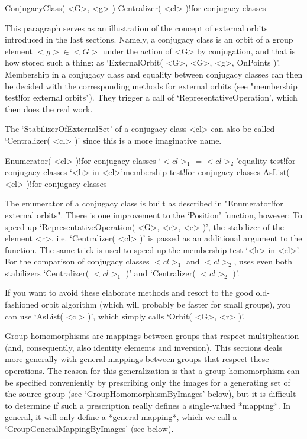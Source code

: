 \null

\>ConjugacyClass( <G>, <g> )
\>Centralizer( <cl> )!{for conjugacy classes}

This paragraph  serves  as an illustration  of  the  concept  of external
orbits introduced in  the last sections. Namely,  a conjugacy class is an
orbit  of a   group  element $<g>\in  <G>$  under  the action  of <G>  by
conjugation,  and   that  is  how    {\GAP}  stored such    a  thing:  as
`ExternalOrbit(  <G>,  <G>, <g>, OnPoints  )'.  Membership in a conjugacy
class and equality between conjugacy classes can then be decided with the
corresponding   methods for  external  orbits   (see "membership test!for
external orbits").  They trigger   a call  of  `RepresentativeOperation',
which then does the real work.

The  `StabilizerOfExternalSet' of  a   conjugacy class <cl>  can also  be
called `Centralizer( <cl> )' since this is a more imaginative name.

\>Enumerator( <cl> )!{for conjugacy classes}
\>`$<cl>_1$ = $<cl>_2$'{equality test}!{for conjugacy classes}
\>`<h> in <cl>'{membership test}!{for conjugacy classes}
\>AsList( <cl> )!{for conjugacy classes}

The  enumerator  of  a    conjugacy class  is  built  as     described in
"Enumerator!for  external orbits".  There   is  one  improvement  to  the
`Position' function,  however: To speed up `RepresentativeOperation( <G>,
<r>, <e>  )', the stabilizer of  the element <r>, i.e. `Centralizer( <cl>
)' is passed as an additional argument to the function. The same trick is
used to speed up the membership test `<h> in <cl>'. For the comparison of
conjugacy  classes  $<cl>_1$ and   $<cl>_2$,    {\GAP}  uses even    both
stabilizers `Centralizer( $<cl>_1$ )' and `Centralizer( $<cl>_2$ )'.

If   you want to avoid these   elaborate methods and  resort  to the good
old-fashioned orbit  algorithm (which will  probably  be faster for small
groups), you can  use `AsList( <cl>  )', which simply calls `Orbit(  <G>,
<r> )'.


Group homomorphisms    are   mappings  between  groups     that   respect
multiplication (and, consequently, also identity elements and inversion).
This sections  deals more generally  with general mappings between groups
that respect these operations. The reason for this generalization is that
a  group homomorphism can be specified  conveniently  by prescribing only
the     images for  a   generating   set    of  the  source   group  (see
`GroupHomomorphismByImages' below),  but it is  difficult to determine if
such a prescription really defines a single-valued *mapping*. In general,
it     will   only define  a     *general  mapping*, which     we  call a
`GroupGeneralMappingByImages' (see below).

